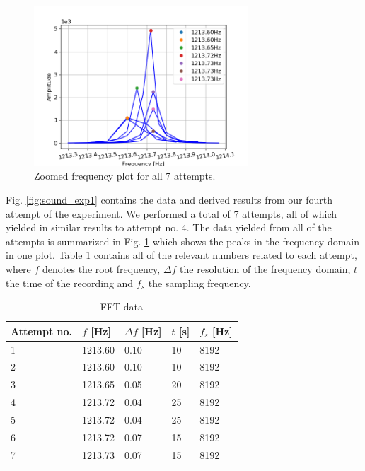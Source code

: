 \documentclass[11pt,a4paper]{article}
\begin{document}
    \begin{figure}[H]
      \centering 
      \includegraphics[width=8cm]{scripts/freq_exp2_all.png}
      \caption{Zoomed frequency plot for all 7 attempts.}
      \label{fig:sound_all}
    \end{figure}
    
    Fig. \ref{fig:sound_exp1} contains the data and derived results from our fourth attempt of the experiment. We performed a total of 7 attempts, all of which yielded in similar results to attempt no. 4. The data yielded from all of the attempts is summarized in Fig. \ref{fig:sound_all} which shows the peaks in the frequency domain in one plot.
    Table \ref{tab:fftdat} contains all of the relevant numbers related to each attempt, where $f$ denotes the root frequency, $\Delta f$ the resolution of the frequency domain, $t$ the time of the recording and $f_s$ the sampling frequency. 


    \begin{table}[H]
      \center
      \caption{FFT data}
      \begin{tabular}{ | l | p{1.4cm} | l | l | l |}
          \hline
          Attempt no. & $f$ [Hz] & $\Delta f$ [Hz] & $t$ [s] & $f_s$ [Hz]\\ \hline
          1 & 1213.60 & 0.10 & 10 & 8192\\ \hline
          2 & 1213.60 & 0.10 & 10 & 8192\\ \hline
          3 & 1213.65 & 0.05 & 20 & 8192\\ \hline
          4 & 1213.72 & 0.04 & 25 & 8192\\ \hline
          5 & 1213.72 & 0.04 & 25 & 8192\\ \hline
          6 & 1213.72 & 0.07 & 15 & 8192\\ \hline
          7 & 1213.73 & 0.07 & 15 & 8192\\ \hline
      \end{tabular}
      \label{tab:fftdat}
    \end{table}
\end{document}
